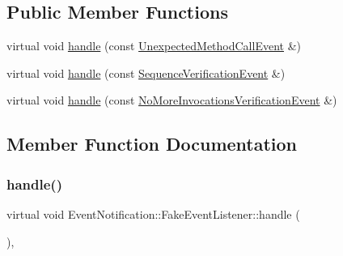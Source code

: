\subsection*{Public Member Functions}
\begin{DoxyCompactItemize}
\item 
virtual void \mbox{\hyperlink{classEventNotification_1_1FakeEventListener_a8d17ab08974befa7c652ef6a672f472a}{handle}} (const \mbox{\hyperlink{structfakeit_1_1UnexpectedMethodCallEvent}{Unexpected\+Method\+Call\+Event}} \&)
\item 
virtual void \mbox{\hyperlink{classEventNotification_1_1FakeEventListener_ac6942db8918e86b3bbd7bf4379021b7c}{handle}} (const \mbox{\hyperlink{structfakeit_1_1SequenceVerificationEvent}{Sequence\+Verification\+Event}} \&)
\item 
virtual void \mbox{\hyperlink{classEventNotification_1_1FakeEventListener_a893aba2096af31fc87a179bf5adf9af4}{handle}} (const \mbox{\hyperlink{structfakeit_1_1NoMoreInvocationsVerificationEvent}{No\+More\+Invocations\+Verification\+Event}} \&)
\end{DoxyCompactItemize}


\subsection{Member Function Documentation}
\mbox{\label{classEventNotification_1_1FakeEventListener_a8d17ab08974befa7c652ef6a672f472a}} 
\subsubsection{\texorpdfstring{handle()}{handle()}\hspace{0.1cm}{\footnotesize\ttfamily [1/3]}}
{\footnotesize\ttfamily virtual void Event\+Notification\+::\+Fake\+Event\+Listener\+::handle (\begin{DoxyParamCaption}\item[{const \mbox{\hyperlink{structfakeit_1_1UnexpectedMethodCallEvent}{Unexpected\+Method\+Call\+Event}} \&}]{ }\end{DoxyParamCaption})\hspace{0.3cm}{\ttfamily [inline]}, {\ttfamily [virtual]}}



